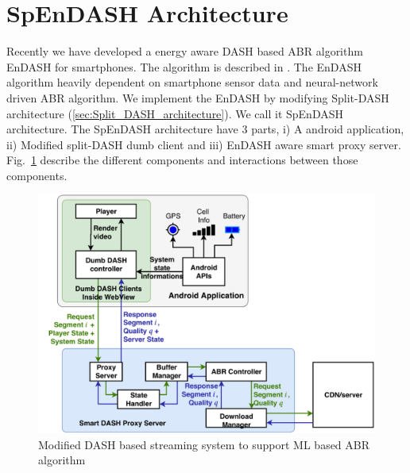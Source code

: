 \section{SpEnDASH Architecture}
Recently we have developed a energy aware DASH based ABR algorithm EnDASH for smartphones. The algorithm is described in . The EnDASH algorithm heavily dependent on smartphone sensor data and neural-network driven ABR algorithm. We implement the EnDASH by modifying Split-DASH architecture (\ref{sec:Split_DASH_architecture}). We call it SpEnDASH architecture. The SpEnDASH architecture have 3 parts, i) A android application, ii) Modified split-DASH dumb client and iii) EnDASH aware smart proxy server. Fig.~\ref{fig:playerDiagram_SpEnDASH} describe the different components and interactions between those components.
\begin{figure}[h!]
	\begin{center}
		\includegraphics[width=0.9\linewidth]{img/playerDiagram_SpEnDASH}
	\end{center}
	\caption{\label{fig:playerDiagram_SpEnDASH} Modified DASH based streaming system to support ML based ABR algorithm}
\end{figure}

